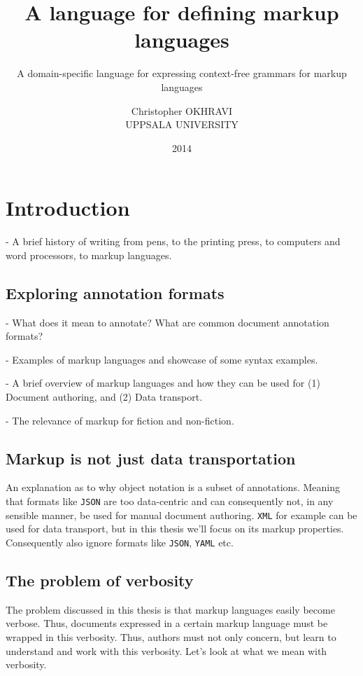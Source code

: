 \documentclass{scrreprt}
\date{2014}
\title{ A language for defining markup languages }
\subtitle{ A domain-specific language for expressing context-free grammars for markup languages }
\author{ Christopher OKHRAVI \\ UPPSALA UNIVERSITY }
\begin{document}
\maketitle
\tableofcontents
\pagebreak



\glsaddall
\printglossary





\chapter{Introduction}

- A brief history of writing from pens, to the printing press, to computers and word processors, to markup languages.
 


\section{Exploring annotation formats}

- What does it mean to annotate? What are common document annotation formats?

- Examples of markup languages and showcase of some syntax examples.

- A brief overview of markup languages and how they can be used for (1) Document authoring, and (2) Data transport.

- The relevance of markup for fiction and non-fiction.



\section{Markup is not just data transportation}
An explanation as to why object notation is a subset of annotations. Meaning that formats like \texttt{JSON} are too data-centric and can consequently not, in any sensible manner, be used for manual document authoring. \texttt{XML} for example can be used for data transport, but in this thesis we'll focus on its markup properties. Consequently also ignore formats like \texttt{JSON}, \texttt{YAML} etc.



\section{The problem of verbosity}
The problem discussed in this thesis is that markup languages easily become verbose. Thus, documents expressed in a certain markup language must be wrapped in this verbosity. Thus, authors must not only concern, but learn to understand and work with this verbosity. Let's look at what we mean with verbosity.
\end{document}

